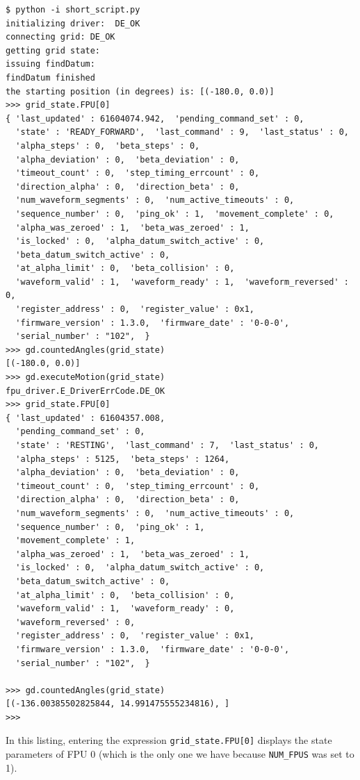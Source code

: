 \documentclass[11pt,a4paper]{scrartcl}
\begin{document}
\begin{verbatim}
$ python -i short_script.py
initializing driver:  DE_OK
connecting grid: DE_OK
getting grid state:
issuing findDatum:
findDatum finished
the starting position (in degrees) is: [(-180.0, 0.0)]
>>> grid_state.FPU[0]
{ 'last_updated' : 61604074.942,  'pending_command_set' : 0,
  'state' : 'READY_FORWARD',  'last_command' : 9,  'last_status' : 0,
  'alpha_steps' : 0,  'beta_steps' : 0,
  'alpha_deviation' : 0,  'beta_deviation' : 0,
  'timeout_count' : 0,  'step_timing_errcount' : 0,
  'direction_alpha' : 0,  'direction_beta' : 0,
  'num_waveform_segments' : 0,  'num_active_timeouts' : 0,
  'sequence_number' : 0,  'ping_ok' : 1,  'movement_complete' : 0,
  'alpha_was_zeroed' : 1,  'beta_was_zeroed' : 1,
  'is_locked' : 0,  'alpha_datum_switch_active' : 0,
  'beta_datum_switch_active' : 0,
  'at_alpha_limit' : 0,  'beta_collision' : 0,
  'waveform_valid' : 1,  'waveform_ready' : 1,  'waveform_reversed' : 0,
  'register_address' : 0,  'register_value' : 0x1,
  'firmware_version' : 1.3.0,  'firmware_date' : '0-0-0',
  'serial_number' : "102",  }
>>> gd.countedAngles(grid_state)
[(-180.0, 0.0)]
>>> gd.executeMotion(grid_state)
fpu_driver.E_DriverErrCode.DE_OK
>>> grid_state.FPU[0]
{ 'last_updated' : 61604357.008,
  'pending_command_set' : 0,
  'state' : 'RESTING',  'last_command' : 7,  'last_status' : 0,
  'alpha_steps' : 5125,  'beta_steps' : 1264,
  'alpha_deviation' : 0,  'beta_deviation' : 0,
  'timeout_count' : 0,  'step_timing_errcount' : 0,
  'direction_alpha' : 0,  'direction_beta' : 0,
  'num_waveform_segments' : 0,  'num_active_timeouts' : 0,
  'sequence_number' : 0,  'ping_ok' : 1,
  'movement_complete' : 1,
  'alpha_was_zeroed' : 1,  'beta_was_zeroed' : 1,
  'is_locked' : 0,  'alpha_datum_switch_active' : 0,
  'beta_datum_switch_active' : 0,
  'at_alpha_limit' : 0,  'beta_collision' : 0,
  'waveform_valid' : 1,  'waveform_ready' : 0,
  'waveform_reversed' : 0,
  'register_address' : 0,  'register_value' : 0x1,
  'firmware_version' : 1.3.0,  'firmware_date' : '0-0-0',
  'serial_number' : "102",  }

>>> gd.countedAngles(grid_state)
[(-136.00385502825844, 14.991475555234816), ]
>>>
\end{verbatim}

In this listing, entering the expression \verb+grid_state.FPU[0]+
displays the state parameters of FPU 0 (which is the only one we have
because \texttt{NUM\_FPUS} was set to 1).
\end{document}
